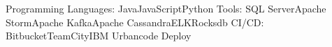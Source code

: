 \begin{cvskills}
    \cvskill
        {Programming Languages:}
        {Java{\enskip\cdotp\enskip}JavaScript{\enskip\cdotp\enskip}Python}
    \cvskill  
        {Tools:}
        {SQL Server{\enskip\cdotp\enskip}Apache Storm{\enskip\cdotp\enskip}Apache Kafka{\enskip\cdotp\enskip}Apache Cassandra{\enskip\cdotp\enskip}ELK{\enskip\cdotp\enskip}Rocksdb}
    \cvskill  
        {CI/CD:}
        {Bitbucket{\enskip\cdotp\enskip}TeamCity{\enskip\cdotp\enskip}IBM Urbancode Deploy}
\end{cvskills}
